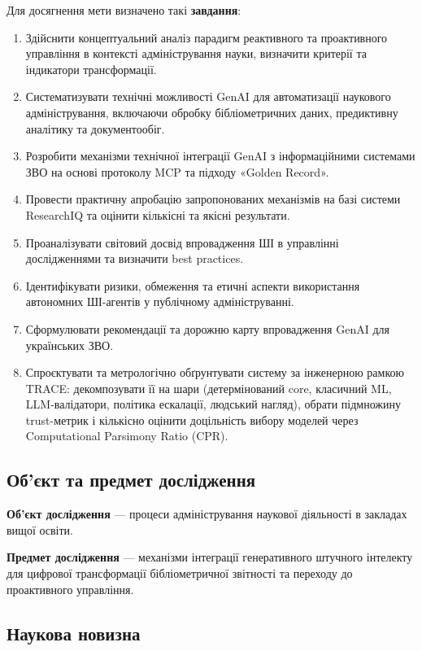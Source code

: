 Для досягнення мети визначено такі \textbf{завдання}:
\begin{enumerate}[leftmargin=*,itemsep=0.2em]
\item Здійснити концептуальний аналіз парадигм реактивного та проактивного управління в контексті адміністрування науки, визначити критерії та індикатори трансформації.
\item Систематизувати технічні можливості GenAI для автоматизації наукового адміністрування, включаючи обробку бібліометричних даних, предиктивну аналітику та документообіг.
\item Розробити механізми технічної інтеграції GenAI з інформаційними системами ЗВО на основі протоколу MCP та підходу «Golden Record».
\item Провести практичну апробацію запропонованих механізмів на базі системи ResearchIQ та оцінити кількісні та якісні результати.
\item Проаналізувати світовий досвід впровадження ШІ в управлінні дослідженнями та визначити best practices.
\item Ідентифікувати ризики, обмеження та етичні аспекти використання автономних ШІ-агентів у публічному адмініструванні.
\item Сформулювати рекомендації та дорожню карту впровадження GenAI для українських ЗВО.
\iftrace
\item Спроєктувати та метрологічно обґрунтувати систему за інженерною рамкою TRACE: декомпозувати її на шари (детермінований core, класичний ML, LLM-валідатори, політика ескалації, людський нагляд), обрати підмножину trust-метрик і кількісно оцінити доцільність вибору моделей через Computational Parsimony Ratio (CPR).
\fi
\end{enumerate}

\subsection*{Об'єкт та предмет дослідження}

\textbf{Об'єкт дослідження} --- процеси адміністрування наукової діяльності в закладах вищої освіти.

\textbf{Предмет дослідження} --- механізми інтеграції генеративного штучного інтелекту для цифрової трансформації бібліометричної звітності та переходу до проактивного управління.

\subsection*{Наукова новизна}

